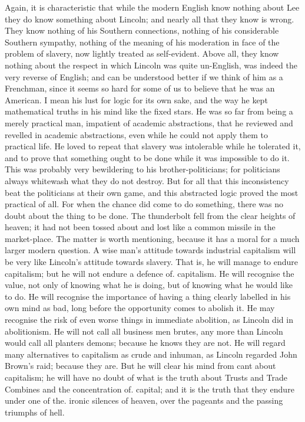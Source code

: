 \documentclass{book}
\begin{document}
Again, it is characteristic that while the modern English know nothing about Lee they do know something about Lincoln; and nearly all that they know is wrong. They know nothing of his Southern connections, nothing of his considerable Southern sympathy, nothing of the meaning of his moderation in face of the problem of slavery, now lightly treated as self-evident. Above all, they know nothing about the respect in which Lincoln was quite un-English, was indeed the very reverse of English; and can be understood better if we think of him as a Frenchman, since it seems so hard for some of us to believe that he was an American. I mean his lust for logic for its own sake, and the way he kept mathematical truths in his mind like the fixed stars. He was so far from being a merely practical man, impatient of academic abstractions, that he reviewed and revelled in academic abstractions, even while he could not apply them to practical life. He loved to repeat that slavery was intolerable while he tolerated it, and to prove that something ought to be done while it was impossible to do it. This was probably very bewildering to his brother-politicians; for politicians always whitewash what they do not destroy. But for all that this inconsistency beat the politicians at their own game, and this abstracted logic proved the most practical of all. For when the chance did come to do something, there was no doubt about the thing to be done. The thunderbolt fell from the clear heights of heaven; it had not been tossed about and lost like a common missile in the market-place. The matter is worth mentioning, because it has a moral for a much larger modern question. A wise man’s attitude towards industrial capitalism will be very like Lincoln’s attitude towards slavery. That is, he will manage to endure capitalism; but he will not endure a defence of. capitalism. He will recognise the value, not only of knowing what he is doing, but of knowing what he would like to do. He will recognise the importance of having a thing clearly labelled in his own mind as bad, long before the opportunity comes to abolish it. He may recognise the risk of even worse things in immediate abolition, as Lincoln did in abolitionism. He will not call all business men brutes, any more than Lincoln would call all planters demons; because he knows they are not. He will regard many alternatives to capitalism as crude and inhuman, as Lincoln regarded John Brown’s raid; because they are. But he will clear his mind from cant about capitalism; he will have no doubt of what is the truth about Trusts and Trade Combines and the concentration of. capital; and it is the truth that they endure under one of the. ironic silences of heaven, over the pageants and the passing triumphs of hell.
\end{document}
